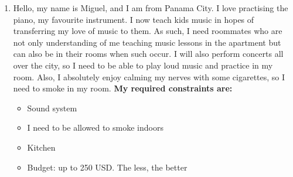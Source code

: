 \begin{enumerate}
\item Hello, my name is Miguel, and I am from Panama City. I love practising the piano, my favourite instrument. I now teach kids music in hopes of transferring my love of music to them. As such, I need roommates who are not only understanding of me teaching music lessons in the apartment but can also be in their rooms when such occur. I will also perform concerts all over the city, so I need to be able to play loud music and practice in my room. Also, I absolutely enjoy calming my nerves with some cigarettes, so I need to smoke in my room. \textbf{My required constraints are:}
\begin{itemize}
    \item Sound system
    \item I need to be allowed to smoke indoors
    \item Kitchen
    \item Budget: up to 250 USD. The less, the better
\end{itemize}
\end{enumerate}


